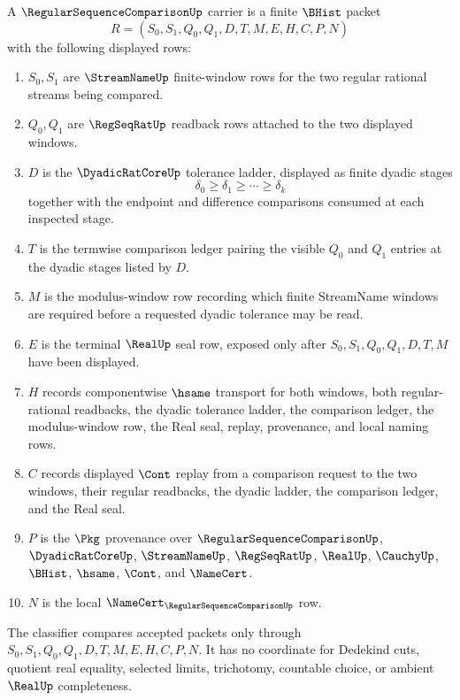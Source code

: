 \begin{definition}
\label{def:regular-sequence-comparison-carrier}
A $\RegularSequenceComparisonUp$ carrier is a finite $\BHist$ packet
$$
R=(S_0,S_1,Q_0,Q_1,D,T,M,E,H,C,P,N)
$$
with the following displayed rows:
\begin{enumerate}
\item $S_0,S_1$ are $\StreamNameUp$ finite-window rows for the two regular rational streams being compared.
\item $Q_0,Q_1$ are $\RegSeqRatUp$ readback rows attached to the two displayed windows.
\item $D$ is the $\DyadicRatCoreUp$ tolerance ladder, displayed as finite dyadic stages
$$
\delta_0 \geq \delta_1 \geq \cdots \geq \delta_k
$$
together with the endpoint and difference comparisons consumed at each inspected stage.
\item $T$ is the termwise comparison ledger pairing the visible $Q_0$ and $Q_1$ entries at the dyadic stages listed by $D$.
\item $M$ is the modulus-window row recording which finite StreamName windows are required before a requested dyadic tolerance may be read.
\item $E$ is the terminal $\RealUp$ seal row, exposed only after $S_0,S_1,Q_0,Q_1,D,T,M$ have been displayed.
\item $H$ records componentwise $\hsame$ transport for both windows, both regular-rational readbacks, the dyadic tolerance ladder, the comparison ledger, the modulus-window row, the Real seal, replay, provenance, and local naming rows.
\item $C$ records displayed $\Cont$ replay from a comparison request to the two windows, their regular readbacks, the dyadic ladder, the comparison ledger, and the Real seal.
\item $P$ is the $\Pkg$ provenance over $\RegularSequenceComparisonUp$, $\DyadicRatCoreUp$, $\StreamNameUp$, $\RegSeqRatUp$, $\RealUp$, $\CauchyUp$, $\BHist$, $\hsame$, $\Cont$, and $\NameCert$.
\item $N$ is the local $\NameCert_{\RegularSequenceComparisonUp}$ row.
\end{enumerate}
The classifier compares accepted packets only through $S_0,S_1,Q_0,Q_1,D,T,M,E,H,C,P,N$. It has no coordinate for Dedekind cuts, quotient real equality, selected limits, trichotomy, countable choice, or ambient $\RealUp$ completeness.
\end{definition}

